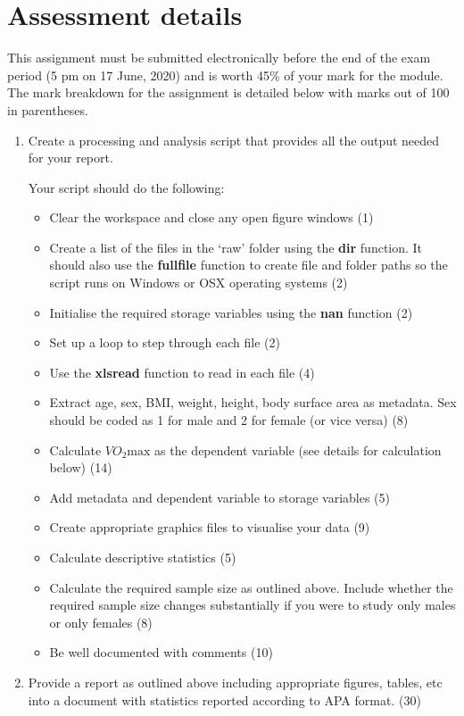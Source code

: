 \documentclass[12pt,a4paper]{article}
\begin{document}
\section{Assessment details}
This assignment must be submitted electronically before the end of the exam period (5 pm on 17 June, 2020) and is worth 45\% of your mark for the module. The mark breakdown for the assignment is detailed below with marks out of 100 in parentheses.
\begin{enumerate}
	\item Create a processing and analysis script that provides all the output needed for your report.
	
	Your script should do the following:
	\begin{itemize}
		\item Clear the workspace and close any open figure windows \hfill (1)
		\item Create a list of the files in the `raw' folder using the \textbf{dir} function. It should also use the \textbf{fullfile} function to create file and folder paths so the script runs on Windows or OSX operating systems \hfill (2)
		\item Initialise the required storage variables using the \textbf{nan} function \hfill (2)
		\item Set up a loop to step through each file \hfill (2)
		\item Use the \textbf{xlsread} function to read in each file \hfill (4)
		\item Extract age, sex, BMI, weight, height, body surface area as metadata. Sex should be coded as 1 for male and 2 for female (or vice versa) \hfill (8)
		\item Calculate $VO_{2}\text{max}$ as the dependent variable (see details for calculation below) \hfill (14)
		\item Add metadata and dependent variable to storage variables \hfill (5)
		\item Create appropriate graphics files to visualise your data \hfill (9)
		\item Calculate descriptive statistics \hfill (5)
		\item Calculate the required sample size as outlined above. Include whether the required sample size changes substantially if you were to study only males or only females \hfill (8)
		\item Be well documented with comments \hfill (10)
	\end{itemize}
	
	\item Provide a report as outlined above including appropriate figures, tables, etc into a document with statistics reported according to APA format. \hfill (30)
\end{enumerate}
\end{document}

